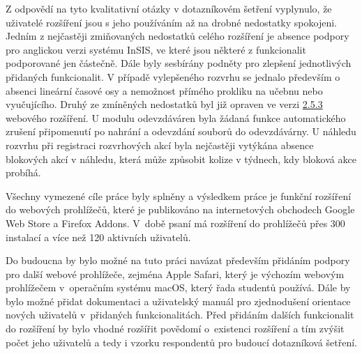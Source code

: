 Z odpovědí na tyto kvalitativní otázky v dotazníkovém šetření vyplynulo, že uživatelé rozšíření jsou s jeho používáním až na drobné nedostatky spokojeni. Jedním z nejčastěji zmiňovaných nedostatků celého rozšíření je absence podpory pro anglickou verzi systému InSIS, ve které jsou některé z funkcionalit podporované jen částečně. Dále byly sesbírány podněty pro zlepšení jednotlivých přidaných funkcionalit. V případě vylepšeného rozvrhu se jednalo především o absenci lineární časové osy a nemožnost přímého prokliku na učebnu nebo vyučujícího. Druhý ze zmíněných nedostatků byl již opraven ve verzi \href{https://gitlab.com/vse-plus/extension/-/releases/v2.5.3}{2.5.3} webového rozšíření. U modulu odevzdáváren byla žádaná funkce automatického zrušení připomenutí po nahrání a odevzdání souborů do odevzdávárny. U náhledu rozvrhu při registraci rozvrhových akcí byla nejčastěji vytýkána absence blokových akcí v náhledu, která může způsobit kolize v týdnech, kdy bloková akce probíhá.

Všechny vymezené cíle práce byly splněny a výsledkem práce je funkční rozšíření do webových prohlížečů, které je publikováno na internetových obchodech Google Web Store a Firefox Addons. V~době psaní má rozšíření do prohlížečů přes 300 instalací a více než 120 aktivních uživatelů. 

Do budoucna by bylo možné na tuto práci navázat především přidáním podpory pro další webové prohlížeče, zejména Apple Safari, který je výchozím webovým prohlížečem v~operačním systému macOS, který řada studentů používá. Dále by bylo možné přidat dokumentaci a uživatelský manuál pro zjednodušení orientace nových uživatelů v~přidaných funkcionalitách. Před přidáním dalších funkcionalit do rozšíření by bylo vhodné rozšířit povědomí o~existenci rozšíření a tím zvýšit počet jeho uživatelů a tedy i vzorku respondentů pro budoucí dotazníková šetření. 
